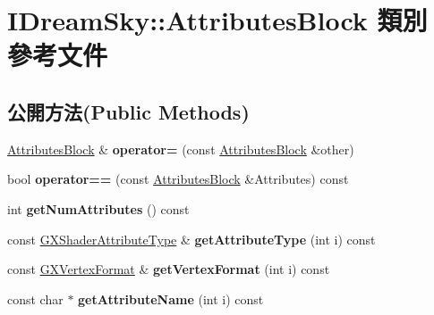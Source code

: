 \hypertarget{class_i_dream_sky_1_1_attributes_block}{}\section{I\+Dream\+Sky\+:\+:Attributes\+Block 類別 參考文件}
\label{class_i_dream_sky_1_1_attributes_block}
\subsection*{公開方法(Public Methods)}
\begin{DoxyCompactItemize}
\item 
\hyperlink{class_i_dream_sky_1_1_attributes_block}{Attributes\+Block} \& {\bfseries operator=} (const \hyperlink{class_i_dream_sky_1_1_attributes_block}{Attributes\+Block} \&other)\hypertarget{class_i_dream_sky_1_1_attributes_block_a1436b864ff0a826e1112f592bfe34355}{}\label{class_i_dream_sky_1_1_attributes_block_a1436b864ff0a826e1112f592bfe34355}

\item 
bool {\bfseries operator==} (const \hyperlink{class_i_dream_sky_1_1_attributes_block}{Attributes\+Block} \&Attributes) const \hypertarget{class_i_dream_sky_1_1_attributes_block_acc7c693898005846fbea6aa9673f7466}{}\label{class_i_dream_sky_1_1_attributes_block_acc7c693898005846fbea6aa9673f7466}

\item 
int {\bfseries get\+Num\+Attributes} () const \hypertarget{class_i_dream_sky_1_1_attributes_block_a29489aea242cb4a7416bd3e14bbbf385}{}\label{class_i_dream_sky_1_1_attributes_block_a29489aea242cb4a7416bd3e14bbbf385}

\item 
const \hyperlink{class_i_dream_sky_1_1_g_x_shader_attribute_type}{G\+X\+Shader\+Attribute\+Type} \& {\bfseries get\+Attribute\+Type} (int i) const \hypertarget{class_i_dream_sky_1_1_attributes_block_ad53009dbfaed4b8f8bf02bffe30acdea}{}\label{class_i_dream_sky_1_1_attributes_block_ad53009dbfaed4b8f8bf02bffe30acdea}

\item 
const \hyperlink{class_i_dream_sky_1_1_g_x_vertex_format}{G\+X\+Vertex\+Format} \& {\bfseries get\+Vertex\+Format} (int i) const \hypertarget{class_i_dream_sky_1_1_attributes_block_ae9c92a9e56c3aab8bbc6ea6ce11278a3}{}\label{class_i_dream_sky_1_1_attributes_block_ae9c92a9e56c3aab8bbc6ea6ce11278a3}

\item 
const char $\ast$ {\bfseries get\+Attribute\+Name} (int i) const \hypertarget{class_i_dream_sky_1_1_attributes_block_a524bb5b1504231a5773e457d01e70cee}{}\label{class_i_dream_sky_1_1_attributes_block_a524bb5b1504231a5773e457d01e70cee}


\end{DoxyCompactItemize}
